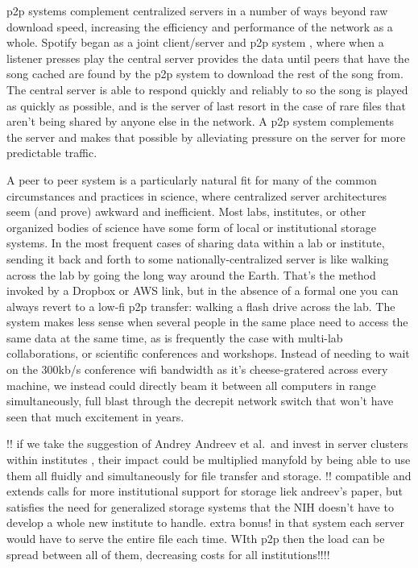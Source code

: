 \documentclass[11pt]{article}
\begin{document}
\begin{multicols}{2}
p2p systems complement centralized servers in a number of ways beyond
raw download speed, increasing the efficiency and performance of the
network as a whole. Spotify began as a joint client/server and p2p
system \cite{kreitzSpotifyLargeScale2010b} , where when a
listener presses play the central server provides the data until peers
that have the song cached are found by the p2p system to download the
rest of the song from. The central server is able to respond quickly and
reliably to so the song is played as quickly as possible, and is the
server of last resort in the case of rare files that aren't being shared
by anyone else in the network. A p2p system complements the server and
makes that possible by alleviating pressure on the server for more
predictable traffic.

A peer to peer system is a particularly natural fit for many of the
common circumstances and practices in science, where centralized server
architectures seem (and prove) awkward and inefficient. Most labs,
institutes, or other organized bodies of science have some form of local
or institutional storage systems. In the most frequent cases of sharing
data within a lab or institute, sending it back and forth to some
nationally-centralized server is like walking across the lab by going
the long way around the Earth. That's the method invoked by a Dropbox or
AWS link, but in the absence of a formal one you can always revert to a
low-fi p2p transfer: walking a flash drive across the lab. The system
makes less sense when several people in the same place need to access
the same data at the same time, as is frequently the case with multi-lab
collaborations, or scientific conferences and workshops. Instead of
needing to wait on the 300kb/s conference wifi bandwidth as it's
cheese-gratered across every machine, we instead could directly beam it
between all computers in range simultaneously, full blast through the
decrepit network switch that won't have seen that much excitement in
years.

!! if we take the suggestion of Andrey Andreev et al.~and invest in
server clusters within institutes \cite{andreevBiologistsNeedModern2021} , their impact could be multiplied
manyfold by being able to use them all fluidly and simultaneously for
file transfer and storage. !! compatible and extends calls for more
institutional support for storage liek andreev's paper, but satisfies
the need for generalized storage systems that the NIH doesn't have to
develop a whole new institute to handle. extra bonus! in that system
each server would have to serve the entire file each time. WIth p2p then
the load can be spread between all of them, decreasing costs for all
institutions!!!!


\end{multicols}
\end{document}
